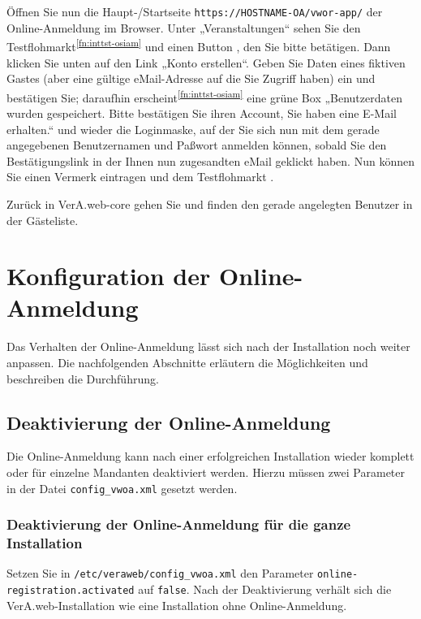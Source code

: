 \documentclass{tarentanleitung}
\begin{document}
Öffnen Sie nun die Haupt‑/Startseite \texttt{https://HOSTNAME-OA/vwor-app/}
der Online-Anmeldung im Browser. Unter „Veranstaltungen“ sehen Sie
den Testflohmarkt\Hair\textsuperscript{\ref{fn:inttst-osiam}} und
einen Button , den Sie bitte
betätigen. Dann klicken Sie unten auf den Link „Konto erstellen“.
Geben Sie Daten eines fiktiven Gastes (aber eine gültige eMail-Adresse
auf die Sie Zugriff haben) ein und bestätigen Sie; daraufhin
erscheint\Hair\textsuperscript{\ref{fn:inttst-osiam}} eine grüne Box
„Benutzerdaten wurden gespeichert. Bitte bestätigen Sie ihren Account,
Sie haben eine E-Mail erhalten.“ und wieder die Loginmaske, auf der
Sie sich nun mit dem gerade angegebenen Benutzernamen und Paßwort
anmelden können, sobald Sie den Bestätigungslink in der Ihnen nun
zugesandten eMail geklickt haben. Nun können Sie einen Vermerk eintragen
und dem Testflohmarkt .

Zurück in VerA.web-core gehen Sie 
und finden den gerade angelegten Benutzer in der Gästeliste.

\section{Konfiguration der Online-Anmeldung}\label{sec:conf-oa}

Das Verhalten der Online-Anmeldung lässt sich nach der Installation
noch weiter anpassen. Die nachfolgenden Abschnitte erläutern die
Möglichkeiten und beschreiben die Durchführung.

\subsection{Deaktivierung der Online-Anmeldung}\label{sec:deactivate-oa}

Die Online-Anmeldung kann nach einer erfolgreichen Installation
wieder komplett oder für einzelne Mandanten deaktiviert werden.
Hierzu müssen zwei Parameter in der Datei \texttt{config\_vwoa.xml}
gesetzt werden.

\subsubsection{Deaktivierung der Online-Anmeldung für die ganze Installation}

Setzen Sie in \texttt{/etc/veraweb/config\_vwoa.xml} den
Parameter \texttt{online-registration.activated} auf \texttt{false}.
Nach der Deaktivierung verhält sich die VerA.web-Installation wie eine
Installation ohne Online-Anmeldung.
\end{document}
